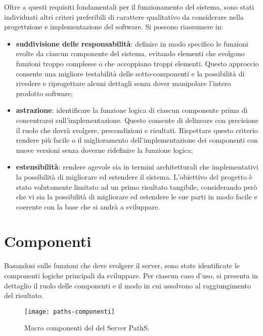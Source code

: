 Oltre a questi requisiti fondamentali per il funzionamento del sistema, sono stati individuati altri criteri preferibili di carattere qualitativo da considerare nella progettzione e implementazione del software. Si possono riassumere in:
\begin{itemize}
\item \textbf{suddivisione delle responsabilità}: definire in modo specifico le funzioni svolte da ciascun componente del sistema, evitando elementi che svolgono funzioni troppo complesse o che accoppiano troppi elementi. Questo approccio consente una migliore testabilità delle sotto-componenti e la possibilità di rivedere e riprogettare alcuni dettagli senza dover manipolare l'intero prodotto software;
\item \textbf{astrazione}: identificare la funzione logica di ciascun componente prima di concentrarsi sull'implementazione. Questo consente di delineare con precisione il ruolo che dovrà svolgere, precondizioni e risultati. Rispettare questo criterio rendere più facile o il miglioramento dell'implementazione dei componenti con nuove versioni senza doverne ridefinire la funzione logica;
\item \textbf{estensibilità}: rendere agevole sia in termini architetturali che implementativi la possibilità di migliorare ed estendere il sistema. L'obiettivo del progetto è stato volutamente limitato ad un primo risultato tangibile, considerando però che vi sia la possibilità di migliorare ed estendere le sue parti in modo facile e coerente con la base che si andrà a sviluppare.
\end{itemize}

\section{Componenti}
Basandosi sulle funzioni che deve svolgere il server, sono state identificate le componenti logiche principali da sviluppare. Per ciascun caso d'uso, si presenta in dettaglio il ruolo delle componenti e il modo in cui assolvono al raggiungimento del risultato.

\begin{figure}[ht]
  \centering
  \texttt{[image: paths-componenti]}
  \caption{\footnotesize{Macro componenti del del Server PathS.}}
  \label{fig:paths-componenti}
\end{figure}

